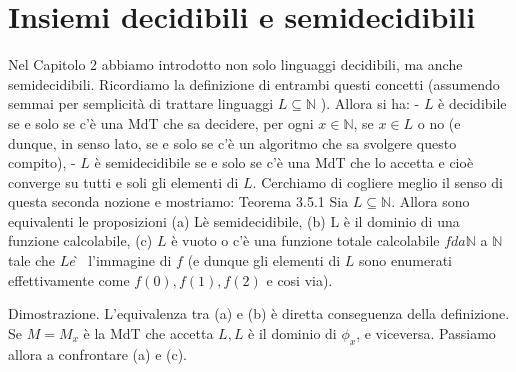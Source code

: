 \section{Insiemi decidibili e semidecidibili}

Nel Capitolo 2 abbiamo introdotto non solo linguaggi
decidibili, ma anche semidecidibili. Ricordiamo la definizione di entrambi
questi concetti (assumendo semmai per semplicità di trattare linguaggi $L
    \subseteq \mathbb{N}$ ). Allora si ha: - $L$ è decidibile se e solo se c'è una
MdT che sa decidere, per ogni $x \in \mathbb{N}$, se $x \in L$ o no (e dunque,
in senso lato, se e solo se c'è un algoritmo che sa svolgere questo compito), -
$L$ è semidecidibile se e solo se c'è una MdT che lo accetta e cioè converge su
tutti e soli gli elementi di $L$. Cerchiamo di cogliere meglio il senso di
questa seconda nozione e mostriamo: Teorema 3.5.1 Sia $L \subseteq \mathbb{N}$.
Allora sono equivalenti le proposizioni (a) Lè semidecidibile, (b) L è il
dominio di una funzione calcolabile, (c) $L$ è vuoto o c'è una funzione totale
calcolabile $f d a \mathbb{N}$ a $\mathbb{N}$ tale che $L e ̀$ l'immagine di $f$
(e dunque gli elementi di $L$ sono enumerati effettivamente come $f(0), f(1),
    f(2)$ e cosi via).

Dimostrazione. L'equivalenza tra (a) e (b) è diretta conseguenza della
definizione. Se $M=M_x$ è la MdT che accetta $L, L$ è il dominio di $\phi_x$, e
viceversa. Passiamo allora a confrontare (a) e (c).